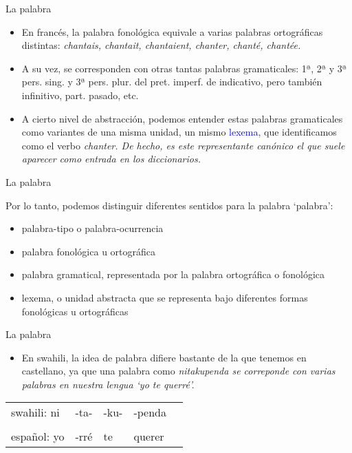 \documentclass{beamer}
\begin{document}
\begin{frame}{La palabra}

\begin{itemize}
	\item En francés, la palabra fonológica  equivale a varias palabras ortográficas distintas: \it{chantais, chantait, chantaient, chanter, chanté, chantée}.
	\item A su vez, se corresponden con otras tantas palabras gramaticales: 1ª, 2ª y 3ª pers. sing. y 3ª pers. plur. del pret. imperf. de indicativo, pero también infinitivo, part. pasado, etc.
	\item A cierto nivel de abstracción, podemos entender estas palabras gramaticales como variantes de una misma unidad, un mismo \textcolor{blue}{lexema}, que identificamos como el verbo \it{chanter}. De hecho, es este representante canónico el que suele aparecer como entrada en los diccionarios.
	
\end{itemize}

\end{frame}

\begin{frame}{La palabra}

Por lo tanto, podemos distinguir diferentes sentidos para la palabra `palabra':

\begin{itemize}
	\item palabra-tipo o palabra-ocurrencia
	\item palabra fonológica u ortográfica
	\item palabra gramatical, representada por la palabra ortográfica o fonológica
	\item lexema, o unidad abstracta que se representa bajo diferentes formas fonológicas u ortográficas
\end{itemize}
	

\end{frame}

\begin{frame}{La palabra}

\begin{itemize}
	\item En swahili, la idea de palabra difiere bastante de la que tenemos en castellano, ya que una palabra como \it{nitakupenda} se correponde con varias palabras en nuestra lengua `yo te querré'. 
\end{itemize}

\begin{center}
\begin{tabular}{l l l l l}
swahili: ni & -ta-  & -ku- & -penda\\
& & & & \\
español: yo & -rré & te & querer\\
\end{tabular}
\end{center}


\end{frame}
\end{document}
